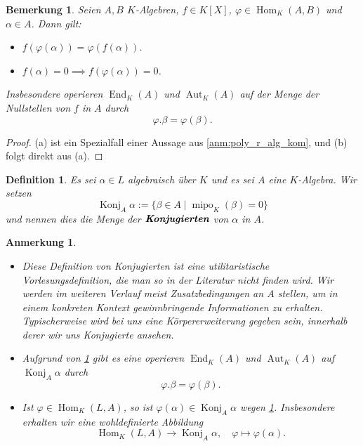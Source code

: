 \documentclass[a4paper, twoside, 11pt, ngerman]{report}
\DeclareMathOperator{\Aut}{Aut}
\DeclareMathOperator{\End}{End}
\DeclareMathOperator{\Hom}{Hom}
\DeclareMathOperator{\Konj}{Konj}
\DeclareMathOperator{\mipo}{mipo}
\theoremstyle{definistyle}
\newtheorem{defini}[satz]{Definition}
\newtheorem{bem}[satz]{Bemerkung}
\newtheorem{anm}[satz]{Anmerkung}
\theoremstyle{remark}
\newcommand{\defn}[1]{\textit{\bfseries #1}}
\begin{document}
\begin{bem}\label{bem:k-algebra_homomorphismen}
Seien $A, B$ $K$-Algebren, $f \in K[X]$, $\varphi \in \Hom_K(A, B)$ und $\alpha \in A$. Dann gilt:
\begin{itemize}
    \item[(a)] $f(\varphi(\alpha)) = \varphi(f(\alpha))$.
    \item[(b)] $f(\alpha) = 0 \implies f(\varphi(\alpha)) = 0$.
\end{itemize}
Insbesondere operieren $\End_K(A)$ und $\Aut_K(A)$ auf der Menge der Nullstellen von $f$ in $A$ durch \[\varphi.\beta=\varphi(\beta).\]
\end{bem}

\begin{proof}
(a) ist ein Spezialfall einer Aussage aus \ref{anm:poly_r_alg_kom}, und (b) folgt direkt aus (a).
\end{proof}

\begin{defini}\label{def:konjugierte}
Es sei $\alpha\in L$ algebraisch über $K$ und es sei $A$ eine $K$-Algebra.
Wir setzen
\[
\Konj_A\alpha:=\{ \beta\in A \mid \mipo_K(\beta) = 0\}
\]
und nennen dies die Menge der $\defn{Konjugierten}$ von $\alpha$ in $A$.
\end{defini}

\begin{anm}\label{anm:konjugierte}
\begin{itemize}
\item Diese Definition von Konjugierten ist eine utilitaristische Vorlesungsdefinition, die man so in der Literatur nicht finden wird. Wir werden im weiteren Verlauf meist Zusatzbedingungen an $A$ stellen, um in einem konkreten Kontext gewinnbringende Informationen zu erhalten. Typischerweise wird bei uns eine Körpererweiterung gegeben sein, innerhalb derer wir uns Konjugierte ansehen.
\item Aufgrund von \ref{bem:k-algebra_homomorphismen} gibt es eine operieren $\End_K(A)$ und $\Aut_K(A)$ auf $\Konj_A\alpha$ durch
\[\varphi.\beta=\varphi(\beta).\]
\item Ist $\varphi\in\Hom_K(L,A)$, so ist $\varphi(\alpha)\in\Konj_A\alpha$ wegen \ref{bem:k-algebra_homomorphismen}. Insbesondere erhalten wir eine wohldefinierte Abbildung
\[
\Hom_K(L,A)\to \Konj_A\alpha, \quad \varphi\mapsto\varphi(\alpha).
\]
\end{itemize}
\end{anm}
\end{document}
